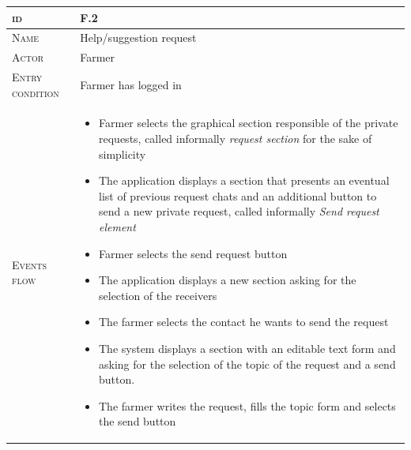 
\begin{table}[H]
    \centering
    \begin{tabular}{|l|p{}|}
        \hline %
    	\textsc{id}                 &   F.2\\
    	\hline %
    	\textsc{Name}               &   Help/suggestion request\\
    	\hline %
    	\textsc{Actor}             &   Farmer\\
    	\hline %
    	\textsc{Entry condition}   &   Farmer has logged in\\
    	\hline %
    	\textsc{Events flow}         &   %
            	                        \begin{itemize}
                                    	    \item Farmer selects the graphical section responsible of the private requests, called informally \textit{request section} for the sake of simplicity
                                    		\item The application displays a section that presents an eventual list of previous request chats and an additional button to send a new private request, called informally \textit{Send request element}
                                    		\item Farmer selects the send request button
                                    		\item The application displays a new section asking for the selection of the receivers
                                    		\item The farmer selects the contact he wants to send the request
                                    		\item The system displays a section with an editable text form and asking for the selection of the topic of the request and a send button.
                                    		\item The farmer writes the request, fills the topic form and selects the send button
                                        \end{itemize}\\

\end{tabular}
\end{table}
